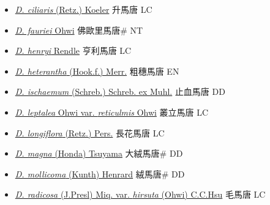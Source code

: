 \begin{itemize}
  \begin{itemize}
        \item[] \href{http://www.theplantlist.org/tpl1.1/search?q=Digitaria+ciliaris}{\textit{D. ciliaris} (Retz.) Koeler}   升馬唐 LC
        \item[] \href{http://www.theplantlist.org/tpl1.1/search?q=Digitaria+fauriei}{\textit{D. fauriei} Ohwi}   佛歐里馬唐\# NT
        \item[] \href{http://www.theplantlist.org/tpl1.1/search?q=Digitaria+henryi}{\textit{D. henryi} Rendle}   亨利馬唐 LC
        \item[] \href{http://www.theplantlist.org/tpl1.1/search?q=Digitaria+heterantha}{\textit{D. heterantha} (Hook.f.) Merr.}   粗穗馬唐 EN
        \item[] \href{http://www.theplantlist.org/tpl1.1/search?q=Digitaria+ischaemum}{\textit{D. ischaemum} (Schreb.) Schreb. ex Muhl.}   止血馬唐 DD
        \item[] \href{http://www.theplantlist.org/tpl1.1/search?q=Digitaria+leptalea+var.+reticulmis}{\textit{D. leptalea} Ohwi var. \textit{reticulmis} Ohwi}   叢立馬唐 LC
        \item[] \href{http://www.theplantlist.org/tpl1.1/search?q=Digitaria+longiflora}{\textit{D. longiflora} (Retz.) Pers.}   長花馬唐 LC
        \item[] \href{http://www.theplantlist.org/tpl1.1/search?q=Digitaria+magna}{\textit{D. magna} (Honda) Tsuyama}   大絨馬唐\# DD
        \item[] \href{http://www.theplantlist.org/tpl1.1/search?q=Digitaria+mollicoma}{\textit{D. mollicoma} (Kunth) Henrard}   絨馬唐\# DD
        \item[] \href{http://www.theplantlist.org/tpl1.1/search?q=Digitaria+radicosa+var.+hirsuta}{\textit{D. radicosa} (J.Presl) Miq. var. \textit{hirsuta} (Ohwi) C.C.Hsu}   毛馬唐 LC

\end{itemize}
\end{itemize}
